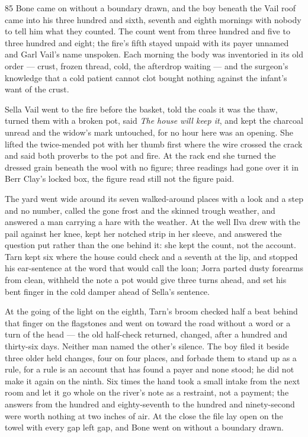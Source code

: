 \begin{CRchronicle}{85}
Bone came on without a boundary drawn, and the boy beneath the Vail roof came into his three hundred and sixth, seventh and eighth mornings with nobody to tell him what they counted. The count went from three hundred and five to three hundred and eight; the fire’s fifth stayed unpaid with its payer unnamed and Garl Vail’s name unspoken. Each morning the body was inventoried in its old order --- crust, frozen thread, cold, the afterdrop waiting --- and the surgeon’s knowledge that a cold patient cannot clot bought nothing against the infant’s want of the crust.

Sella Vail went to the fire before the basket, told the coals it was the thaw, turned them with a broken pot, said \emph{The house will keep it}, and kept the charcoal unread and the widow’s mark untouched, for no hour here was an opening. She lifted the twice-mended pot with her thumb first where the wire crossed the crack and said both proverbs to the pot and fire. At the rack end she turned the dressed grain beneath the wool with no figure; three readings had gone over it in Berr Clay’s locked box, the figure read still not the figure paid.

The yard went wide around its seven walked-around places with a look and a step and no number, called the gone frost and the skinned trough weather, and answered a man carrying a hare with the weather. At the well Ilva drew with the pail against her knee, kept her notched strip in her sleeve, and answered the question put rather than the one behind it: she kept the count, not the account. Tarn kept six where the house could check and a seventh at the lip, and stopped his ear-sentence at the word that would call the loan; Jorra parted dusty forearms from clean, withheld the note a pot would give three turns ahead, and set his bent finger in the cold damper ahead of Sella’s sentence.

At the going of the light on the eighth, Tarn’s broom checked half a beat behind that finger on the flagstones and went on toward the road without a word or a turn of the head --- the old half-check returned, changed, after a hundred and thirty-six days. Neither man named the other’s silence. The boy filed it beside three older held changes, four on four places, and forbade them to stand up as a rule, for a rule is an account that has found a payer and none stood; he did not make it again on the ninth. Six times the hand took a small intake from the next room and let it go whole on the river’s note as a restraint, not a payment; the answers from the hundred and eighty-seventh to the hundred and ninety-second were worth nothing at two inches of air. At the close the file lay open on the towel with every gap left gap, and Bone went on without a boundary drawn.
\end{CRchronicle}
